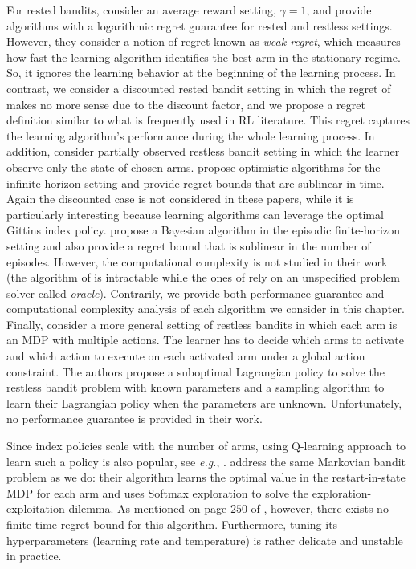 For rested bandits, \cite{tekin2012online} consider an average reward setting, $\gamma=1$, and provide algorithms with a logarithmic regret guarantee for rested and restless settings.
However, they consider a notion of regret known as \emph{weak regret}, which measures how fast the learning algorithm identifies the best arm in the stationary regime. So, it ignores the learning behavior at the beginning of the learning process.
In contrast, we consider a discounted rested bandit setting in which the regret of \cite{tekin2012online} makes no more sense due to the discount factor, and we propose a regret definition similar to what is frequently used in RL literature.
This regret captures the learning algorithm's performance during the whole learning process.
In addition, \cite{ortner2012regret, jung2019regret, wang2020restless} consider partially observed restless bandit setting in which the learner observe only the state of chosen arms. \cite{ortner2012regret, wang2020restless} propose optimistic algorithms for the infinite-horizon setting and provide regret bounds that are sublinear in time. Again the discounted case is not considered in these papers, while it is particularly interesting because learning algorithms can leverage the optimal Gittins index policy.
\cite{jung2019regret} propose a Bayesian algorithm in the episodic finite-horizon setting and also provide a regret bound that is sublinear in the number of episodes. However, the computational complexity is not studied in their work (the algorithm of \cite{ortner2012regret} is intractable while the ones of \cite{jung2019regret, wang2020restless} rely on an unspecified problem solver called \emph{oracle}).
Contrarily, we provide both performance guarantee and computational complexity analysis of each algorithm we consider in this chapter.
Finally, \cite{killian2021beyond} consider a more general setting of restless bandits in which each arm is an MDP with multiple actions. The learner has to decide which arms to activate and which action to execute on each activated arm under a global action constraint. The authors propose a suboptimal Lagrangian policy to solve the restless bandit problem with known parameters and a sampling algorithm to learn their Lagrangian policy when the parameters are unknown. Unfortunately, no performance guarantee is provided in their work.

Since index policies scale with the number of arms, using Q-learning approach to learn such a policy is also popular, see \emph{e.g.},
\cite{avrachenkov2022whittle,fu2019towards,duff1995q}. \cite{duff1995q} address the same Markovian bandit
problem as we do: their algorithm learns the optimal value in the
restart-in-state MDP \cite{katehakis1987multi} for each
arm and uses Softmax exploration to solve the exploration-exploitation
dilemma. As mentioned on page $250$ of
\cite{auer2002finite}, however, there exists no
finite-time regret bound for this algorithm. Furthermore, tuning
its hyperparameters (learning rate and temperature) is rather delicate and
unstable in practice. 

